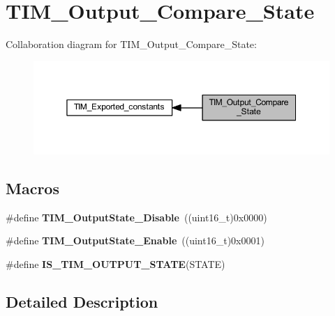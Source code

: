 \hypertarget{group___t_i_m___output___compare___state}{}\section{T\+I\+M\+\_\+\+Output\+\_\+\+Compare\+\_\+\+State}
\label{group___t_i_m___output___compare___state}
Collaboration diagram for T\+I\+M\+\_\+\+Output\+\_\+\+Compare\+\_\+\+State\+:\nopagebreak
\begin{figure}[H]
\begin{center}
\leavevmode
\includegraphics[width=350pt]{group___t_i_m___output___compare___state}
\end{center}
\end{figure}
\subsection*{Macros}
\begin{DoxyCompactItemize}
\item 
\mbox{\label{group___t_i_m___output___compare___state_ga4ad0f484cfa16b5190654da8278940d0}} 
\#define {\bfseries T\+I\+M\+\_\+\+Output\+State\+\_\+\+Disable}~((uint16\+\_\+t)0x0000)
\item 
\mbox{\label{group___t_i_m___output___compare___state_ga65afdda8761b6ac5ed0c0ad67c05dffe}} 
\#define {\bfseries T\+I\+M\+\_\+\+Output\+State\+\_\+\+Enable}~((uint16\+\_\+t)0x0001)
\item 
\#define {\bfseries I\+S\+\_\+\+T\+I\+M\+\_\+\+O\+U\+T\+P\+U\+T\+\_\+\+S\+T\+A\+TE}(S\+T\+A\+TE)
\end{DoxyCompactItemize}


\subsection{Detailed Description}



